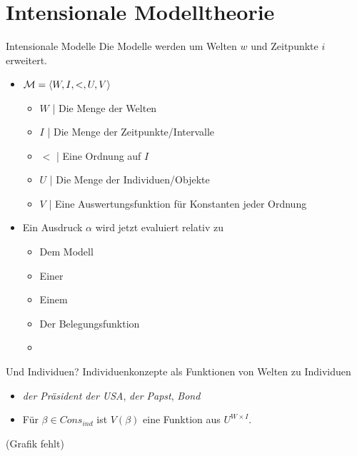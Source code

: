 \section{Intensionale Modelltheorie}

\begin{frame}
  {Intensionale Modelle}
  \onslide<+->
  \onslide<+->
  Die Modelle werden um Welten $w$ und Zeitpunkte $i$ erweitert.\\
  \Halbzeile
  \begin{itemize}[<+->]
    \item \alert{$\mathcal{M}={\langle{}W,I,<,U,V\rangle}$}
      \begin{itemize}[<+->]
        \item \alert{$W$} | Die Menge der Welten
        \item \alert{$I$} | Die Menge der Zeitpunkte\slash Intervalle
        \item \alert{$<$} | Eine Ordnung auf $I$
        \item \alert{$U$} | Die Menge der Individuen\slash Objekte
        \item \alert{$V$} | Eine Auswertungsfunktion für Konstanten jeder Ordnung
      \end{itemize}
      \Halbzeile
    \item Ein Ausdruck $\alpha$ wird jetzt evaluiert relativ zu
      \begin{itemize}[<+->]
        \item Dem Modell \gruen{$\Model$}
        \item Einer  
        \item Einem  
        \item Der Belegungsfunktion 
          \Halbzeile
        \item \gruen{$\DEMM{\alpha}$}
      \end{itemize}
  \end{itemize}
\end{frame}


\begin{frame}
  {Und Individuen?}
  \onslide<+->
  \onslide<+->
  Individuenkonzepte als Funktionen von Welten zu Individuen\\
  \Halbzeile
  \begin{itemize}[<+->]
    \item \textit{der Präsident der USA}, \textit{der Papst}, \textit{Bond}\\
    \item Für \alert{$\beta\in Cons_{ind}$} ist \alert{$V(\beta)$} eine Funktion aus \alert{$U^{W\times I}$}.\\
  \end{itemize}
  \Halbzeile
  \onslide<+->
  \centering 
  (Grafik fehlt)
\end{frame}


